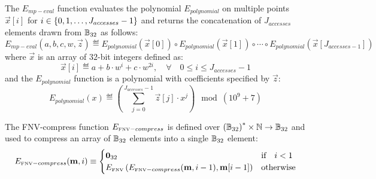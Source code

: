 The $E_{mp-eval}$ function evaluates the polynomial $E_{polynomial}$ on multiple points $\vec{x}[i]$ for $i\in {\left \{{0,1,\dots, J_{accesses}-1} \right \}}$ and returns the concatenation of $J_{accesses}$ elements drawn from $\mathbb{B}_{32}$ as follows:
\begin{equation}
	E_{mp-eval}(a,b,c,w,\vec{z}) \eqdef 
	E_{polynomial}\left(\vec{x}[0]\right) \circ E_{polynomial}\left(\vec{x}[1]\right) \circ \cdots \circ
	E_{polynomial}\left(\vec{x}[J_{accesses-1}]\right)
\end{equation}
where $\vec{x}$ is an array of $32$-bit integers defined as:
\begin{equation}
	\vec{x}[i] \eqdef a+b\cdot w^i + c\cdot w^{2i}, \quad \forall \quad 0\le i \le J_{accesses}-1
\end{equation}
and the $E_{polynomial}$ function is a polynomial with coefficients specified by $\vec{z}$:
\begin{equation}
	E_{polynomial}(x) \eqdef \left(\sum_{j=0}^{J_{accesses}-1} \vec{z}[j]\cdot x^j\right) \mod (10^9+7)
\end{equation}

The FNV-compress function $E_{\text{\tiny FNV}-compress}$ is defined over $\left(\mathbb{B}_{32}\right)^* \times \mathbb{N} \to \mathbb{B}_{32}$ 
and used to compress an array of $\mathbb{B}_{32}$ elements into a single $\mathbb{B}_{32}$ element:
\begin{equation}
	E_{\text{\tiny FNV}-compress}(\mathbf{m},i) \equiv 
	\begin{cases}
		\mathbf{0}_{32} & \text{if} \quad i < 1 \\
		E_\text{\tiny FNV}\left( 
		E_{\text{\tiny FNV}-compress}(\mathbf{m},i-1) ,
		\mathbf{m}[i-1]\right)
		& \text{otherwise}
	\end{cases}
\end{equation}
